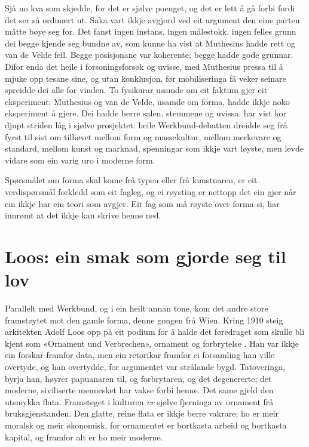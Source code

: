 Sjå no kva som skjedde, for det er sjølve poenget, og det er lett å gå forbi fordi det ser så ordinært ut. Saka vart ikkje avgjord ved eit argument den eine parten måtte bøye seg for. Det fanst ingen instans, ingen målestokk, ingen felles grunn dei begge kjende seg bundne av, som kunne ha vist at Muthesius hadde rett og van de Velde feil. Begge posisjonane var koherente; begge hadde gode grunnar. Difor enda det heile i forsoningsforsøk og uvisse, med Muthesius pressa til å mjuke opp tesane sine, og utan konklusjon, før mobiliseringa få veker seinare spreidde dei alle for vinden. To fysikarar usamde om eit faktum gjer eit eksperiment; Muthesius og van de Velde, usamde om forma, hadde ikkje noko eksperiment å gjere. Dei hadde berre salen, stemmene og uvissa. \textcite{schwartz1996werkbund} har vist kor djupt striden låg i sjølve prosjektet: heile Werkbund-debatten dreidde seg frå fyrst til sist om tilhøvet mellom form og massekultur, mellom merkevare og standard, mellom kunst og marknad, spenningar som ikkje vart løyste, men levde vidare som ein varig uro i moderne form.

Spørsmålet om forma skal kome frå typen eller frå kunstnaren, er eit verdispørsmål forkledd som eit fagleg, og ei røysting er nettopp det ein gjer når ein ikkje har ein teori som avgjer. Eit fag som må røyste over forma si, har innrømt at det ikkje kan skrive henne ned.

\section{Loos: ein smak som gjorde seg til lov}

Parallelt med Werkbund, og i ein heilt annan tone, kom det andre store framstøytet mot den gamle forma, denne gongen frå Wien. Kring 1910 steig arkitekten Adolf Loos opp på eit podium for å halde det føredraget som skulle bli kjent som «Ornament und Verbrechen», ornament og forbrytelse \autocite{loos1908ornament}. Han var ikkje ein forskar framfor data, men ein retorikar framfor ei forsamling han ville overtyde, og han overtydde, for argumentet var strålande bygd. Tatoveringa, byrja han, høyrer papuanaren til, og forbrytaren, og det degenererte; det moderne, siviliserte mennesket har vakse forbi henne. Det same gjeld den utsmykka flata. Framsteget i kulturen \emph{er} sjølve fjerninga av ornament frå bruksgjenstanden. Den glatte, reine flata er ikkje berre vakrare; ho er meir moralsk og meir økonomisk, for ornamentet er bortkasta arbeid og bortkasta kapital, og framfor alt er ho meir moderne.

